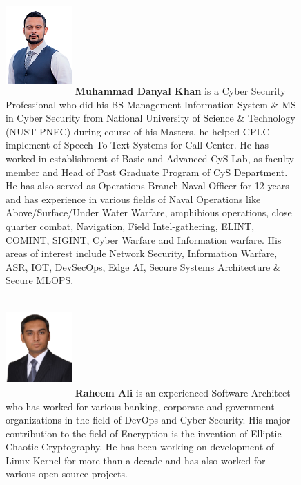 \documentclass[3p,times]{elsarticle}
\begin{document}
\begin{figure}[h]
\includegraphics[width=1in,height=1.5in,clip,keepaspectratio]{img/Danyal.png}
\textbf{Muhammad Danyal Khan} is a Cyber Security Professional who did his BS Management Information System \& MS in Cyber Security from National University of Science \& Technology (NUST-PNEC) during course of his Masters, he helped CPLC implement of Speech To Text Systems for Call Center. He has worked in establishment of Basic and Advanced CyS Lab, as faculty member and Head of Post Graduate Program of CyS Department. He has also served as Operations Branch Naval Officer for 12 years and has experience in various fields of Naval Operations like Above/Surface/Under Water Warfare, amphibious operations, close quarter combat, Navigation, Field Intel-gathering, ELINT, COMINT, SIGINT, Cyber Warfare and Information warfare. His areas of interest include Network Security, Information Warfare, ASR, IOT, DevSecOps, Edge AI, Secure Systems Architecture \& Secure MLOPS.
\end{figure}

\begin{figure}[h]
\includegraphics[width=1in,height=1.5in,clip,keepaspectratio]{img/rahimali.png}
\textbf{Raheem Ali} is an experienced Software Architect who has worked for various banking, corporate and government organizations in the field of DevOps and Cyber Security. His major contribution to the field of Encryption is the invention of Elliptic Chaotic Cryptography. He has been working on development of Linux Kernel for more than a decade and has also worked for various open source projects.
\end{figure}
\end{document}
